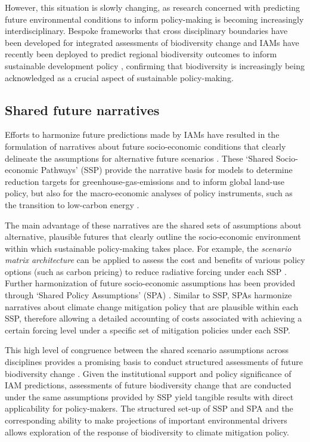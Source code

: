 \documentclass[titlesmallcaps,copyrightpage]{uomthesis}\usepackage[]{graphicx}\usepackage[]{color}
\begin{document}
However, this situation is slowly changing, as research concerned with predicting future environmental conditions to inform policy-making is becoming increasingly interdisciplinary. Bespoke frameworks that cross disciplinary boundaries have been developed for integrated assessments of biodiversity change \citep{newbold2019climate, kapitza_assessing_2021, leclere_bending_2020} and IAMs have recently been deployed to predict regional biodiversity outcomes to inform sustainable development policy \citep{veerkamp_future_2020}, confirming that biodiversity is increasingly being acknowledged as a crucial aspect of sustainable policy-making.

\subsection{Shared future narratives}
Efforts to harmonize future predictions made by IAMs have resulted in the formulation of narratives about future socio-economic conditions that clearly delineate the assumptions for alternative future scenarios \citep{oneill_new_2014, oneill_roads_2017}. These `Shared Socio-economic Pathways' (SSP) \citep{oneill_new_2014} provide the narrative basis for models to determine reduction targets for greenhouse-gas-emissions and to inform global land-use policy, but also for the macro-economic analyses of policy instruments, such as the transition to low-carbon energy \citep{riahi_shared_2017}. 

The main advantage of these narratives are the shared sets of assumptions about alternative, plausible futures that clearly outline the socio-economic environment within which sustainable policy-making takes place. For example, the \textit{scenario matrix architecture} \citep{van_vuuren_new_2014} can be applied to assess the cost and benefits of various policy options (such as carbon pricing) to reduce radiative forcing under each SSP \citep{van_vuuren_new_2014,riahi_shared_2017}. Further harmonization of future socio-economic assumptions has been provided through `Shared Policy Assumptions' (SPA) \citep{kriegler_new_2014}. Similar to SSP, SPAs harmonize narratives about climate change mitigation policy that are plausible within each SSP, therefore allowing a detailed accounting of costs associated with achieving a certain forcing level under a specific set of mitigation policies under each SSP.

This high level of congruence between the shared scenario assumptions across disciplines provides a promising basis to conduct structured assessments of future biodiversity change \citep{leclere_bending_2020, newbold_global_2015}. Given the institutional support and policy significance of IAM predictions, assessments of future biodiversity change that are conducted under the same assumptions provided by SSP yield tangible results with direct applicability for policy-makers. The structured set-up of SSP and SPA and the corresponding ability to make projections of important environmental drivers allows exploration of the response of biodiversity to climate mitigation policy.
\end{document}
